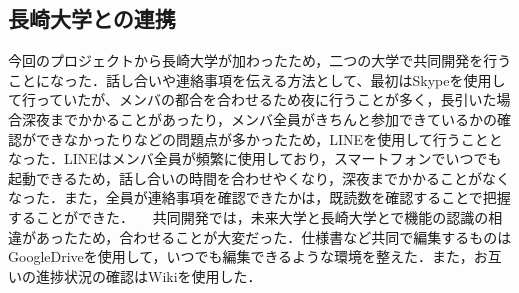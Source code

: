 \subsection{長崎大学との連携}
 今回のプロジェクトから長崎大学が加わったため，二つの大学で共同開発を行うことになった．話し合いや連絡事項を伝える方法として、最初はSkypeを使用して行っていたが、メンバの都合を合わせるため夜に行うことが多く，長引いた場合深夜までかかることがあったり，メンバ全員がきちんと参加できているかの確認ができなかったりなどの問題点が多かったため，LINEを使用して行うこととなった．LINEはメンバ全員が頻繁に使用しており，スマートフォンでいつでも起動できるため，話し合いの時間を合わせやくなり，深夜までかかることがなくなった．また，全員が連絡事項を確認できたかは，既読数を確認することで把握することができた．
　共同開発では，未来大学と長崎大学とで機能の認識の相違があったため，合わせることが大変だった．仕様書など共同で編集するものはGoogleDriveを使用して，いつでも編集できるような環境を整えた．また，お互いの進捗状況の確認はWikiを使用した．
